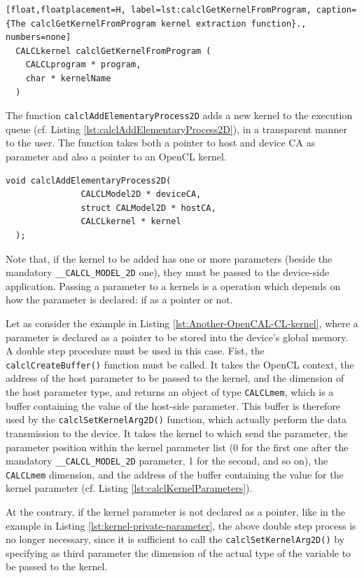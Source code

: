\begin{lstlisting}[float,floatplacement=H, label=lst:calclGetKernelFromProgram, caption={The calclGetKernelFromProgram kernel extraction function}., numbers=none]
  CALCLkernel calclGetKernelFromProgram (
    CALCLprogram * program,
    char * kernelName 
  )
\end{lstlisting}

The function \verb'calclAddElementaryProcess2D' adds a new kernel to
the execution queue (cf. Listing
\ref{lst:calclAddElementaryProcess2D}), in a transparent manner to the
user. The function takes both a pointer to host and device CA as
parameter and also a pointer to an OpenCL kernel.

\begin{lstlisting}[float,floatplacement=TH, label=lst:calclAddElementaryProcess2D, caption=The calclAddElementaryProcess2D function., numbers=none]
  void calclAddElementaryProcess2D(
               CALCLModel2D * deviceCA,
               struct CALModel2D * hostCA,
               CALCLkernel * kernel
  );
\end{lstlisting}

Note that, if the kernel to be added has one or more parameters
(beside the mandatory \verb'__CALCL_MODEL_2D' one), they must be
passed to the device-side application. Passing a parameter to a
kernels is a operation which depends on how the parameter is declared:
if as a pointer or not.

Let as consider the example in Listing
\ref{lst:Another-OpenCAL-CL-kernel}, where a parameter is declared as
a pointer to be stored into the device's global memory. A double step
procedure must be used in this case. Fist, the
\verb'calclCreateBuffer()' function must be called. It takes the
OpenCL context, the address of the host parameter to be passed to the
kernel, and the dimension of the host parameter type, and returns an
object of type \verb'CALCLmem', which is a buffer containing the value
of the host-side parameter. This buffer is therefore used by the
\verb'calclSetKernelArg2D()' function, which actually perform the data
transmission to the device. It takes the kernel to which send the
parameter, the parameter position within the kernel parameter list (0
for the first one after the mandatory \verb'__CALCL_MODEL_2D'
parameter, 1 for the second, and so on), the \verb'CALCLmem'
dimension, and the address of the buffer containing the value for the
kernel parameter (cf. Listing \ref{lst:calclKernelParameters}).

At the contrary, if the kernel parameter is not declared as a pointer,
like in the example in Listing \ref{lst:kernel-private-parameter}, the
above double step process is no longer necessary, since it is
sufficient to call the \verb'calclSetKernelArg2D()' by specifying as
third parameter the dimension of the actual type of the variable to be
passed to the kernel. 

